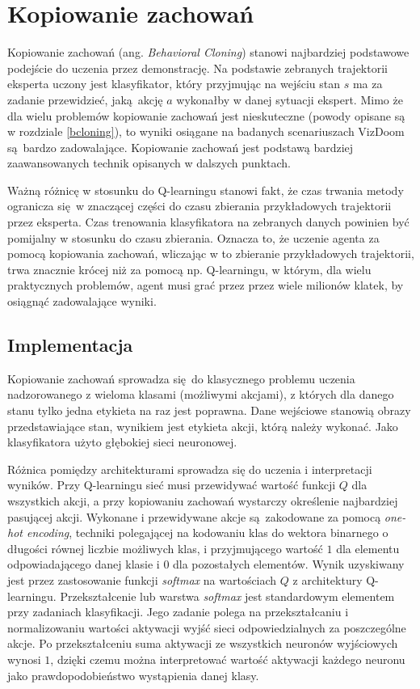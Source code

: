 \section{Kopiowanie zachowań} \label{behavioral_cloning}

Kopiowanie zachowań (ang. \textit{Behavioral Cloning}) stanowi najbardziej podstawowe podejście do uczenia przez demonstrację. Na podstawie zebranych trajektorii eksperta uczony jest klasyfikator, który przyjmując na wejściu stan $s$ ma za zadanie przewidzieć, jaką akcję $a$ wykonałby w danej sytuacji ekspert. Mimo że dla wielu problemów kopiowanie zachowań jest nieskuteczne (powody opisane są w rozdziale \ref{bcloning}), to wyniki osiągane na badanych scenariuszach VizDoom są bardzo zadowalające. Kopiowanie zachowań jest podstawą bardziej zaawansowanych technik opisanych w dalszych punktach.

Ważną różnicę w stosunku do Q-learningu stanowi fakt, że czas trwania metody ogranicza się w znaczącej części do czasu zbierania przykładowych trajektorii przez eksperta. Czas trenowania klasyfikatora na zebranych danych powinien być pomijalny w stosunku do czasu zbierania. Oznacza to, że uczenie agenta za pomocą kopiowania zachowań, wliczając w to zbieranie przykładowych trajektorii, trwa znacznie krócej niż za pomocą np. Q-learningu, w którym, dla wielu praktycznych problemów, agent musi grać przez przez wiele milionów klatek, by osiągnąć zadowalające wyniki. 

\subsection{Implementacja}

Kopiowanie zachowań sprowadza się do klasycznego problemu uczenia nadzorowanego z wieloma klasami (możliwymi akcjami), z których dla danego stanu tylko jedna etykieta na raz jest poprawna. Dane wejściowe stanowią obrazy przedstawiające stan, wynikiem jest etykieta akcji, którą należy wykonać. Jako klasyfikatora użyto głębokiej sieci neuronowej.

Różnica pomiędzy architekturami sprowadza się do uczenia i interpretacji wyników. Przy Q-learningu sieć musi przewidywać wartość funkcji $Q$ dla wszystkich akcji, a przy kopiowaniu zachowań wystarczy określenie najbardziej pasującej akcji. Wykonane i przewidywane akcje są zakodowane za pomocą \textit{one-hot encoding}, techniki polegającej na kodowaniu klas do wektora binarnego o długości równej liczbie możliwych klas, i przyjmującego wartość $1$ dla elementu odpowiadającego danej klasie i $0$ dla pozostałych elementów. Wynik uzyskiwany jest przez zastosowanie funkcji \textit{softmax} na wartościach $Q$ z architektury Q-learningu. Przekształcenie lub warstwa \textit{softmax} jest standardowym elementem przy zadaniach klasyfikacji. Jego zadanie polega na przekształcaniu i normalizowaniu wartości aktywacji wyjść sieci odpowiedzialnych za poszczególne akcje. Po przekształceniu suma aktywacji ze wszystkich neuronów wyjściowych wynosi $1$, dzięki czemu można interpretować wartość aktywacji każdego neuronu jako prawdopodobieństwo wystąpienia danej klasy.

